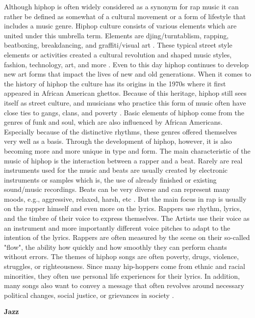 Although hiphop is often widely considered as a synonym for rap music it can rather be defined as somewhat
of a cultural movement or a form of lifestyle that includes a music genre.
Hiphop culture consists of various elements which are united under this umbrella term.
Elements are djing/turntablism, rapping, beatboxing, breakdancing, and graffiti/visual art \cite{MusicalDictHipHop}.
These typical street style elements or activities created a cultural revolution and shaped music styles,
fashion, technology, art, and more \cite{TateHipHop}.
Even to this day hiphop continues to develop new art forms that impact the lives of new and old generations.
When it comes to the history of hiphop the culture has its origins in the 1970s where it first appeared
in African American ghettos.
Because of this heritage, hiphop still sees itself as street culture, and musicians who practice
this form of music often have close ties to gangs, clans, and poverty \cite{Rory2019}.
Basic elements of hiphop come from the genres of funk and soul, which are also influenced by
African Americans.
Especially because of the distinctive rhythms, these genres offered themselves very well as a basis.
Through the development of hiphop, however, it is also becoming more and more unique in type and form.
The main characteristic of the music of hiphop is the interaction between a rapper and a beat.
Rarely are real instruments used for the music and beats are usually created by electronic
instruments or samples which is, the use of already finished or existing sound/music recordings.
Beats can be very diverse and can represent many moods, e.g., aggressive, relaxed, harsh, etc \cite{MusicalDictHipHop}.
But the main focus in rap is usually on the rapper himself and even more on the lyrics.
Rappers use rhythm, lyrics, and the timbre of their voice to express themselves.
The Artists use their voice as an instrument and more importantly different voice pitches
to adapt to the intention of the lyrics.
Rappers are often measured by the scene on their so-called "flow",
the ability how quickly and how smoothly they can perform chants without errors.
The themes of hiphop songs are often poverty, drugs, violence, struggles, or righteousness.
Since many hip-hoppers come from ethnic and racial minorities, they often use personal life
experiences for their lyrics.
In addition, many songs also want to convey a message that often revolves around necessary
political changes, social justice, or grievances in society \cite{Goodrich2017}.

\textbf{Jazz}


